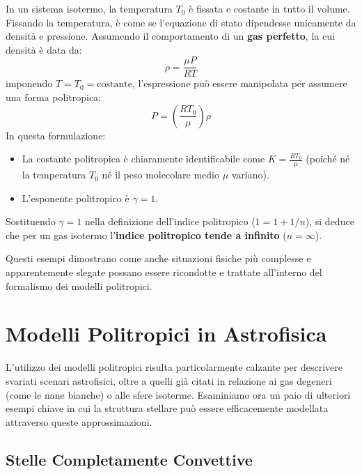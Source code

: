 In un sistema isotermo, la temperatura $T_0$ è fissata e costante in tutto il volume. Fissando la temperatura, è come se l'equazione di stato dipendesse unicamente da densità e pressione. Assumendo il comportamento di un \textbf{gas perfetto}, la cui densità è data da:
\begin{equation}
\rho = \frac{\mu P}{R T}
\end{equation}
imponendo $T = T_0 = \text{costante}$, l'espressione può essere manipolata per assumere una forma politropica:
\begin{equation}
P = \left( \frac{R T_0}{\mu} \right) \rho
\end{equation}
In questa formulazione:
\begin{itemize}
\item La costante politropica è chiaramente identificabile come $K = \frac{R T_0}{\mu}$ (poiché né la temperatura $T_0$ né il peso molecolare medio $\mu$ variano).
\item L'esponente politropico è $\gamma = 1$.
\end{itemize}
Sostituendo $\gamma = 1$ nella definizione dell'indice politropico ($1 = 1 + 1/n$), si deduce che per un gas isotermo l'\textbf{indice politropico tende a infinito} ($n = \infty$).

Questi esempi dimostrano come anche situazioni fisiche più complesse e apparentemente slegate possano essere ricondotte e trattate all'interno del formalismo dei modelli politropici.

\section{Modelli Politropici in Astrofisica}

L'utilizzo dei modelli politropici risulta particolarmente calzante per descrivere svariati scenari astrofisici, oltre a quelli già citati in relazione ai gas degeneri (come le nane bianche) o alle sfere isoterme. Esaminiamo ora un paio di ulteriori esempi chiave in cui la struttura stellare può essere efficacemente modellata attraverso queste approssimazioni.

\subsection{Stelle Completamente Convettive}

